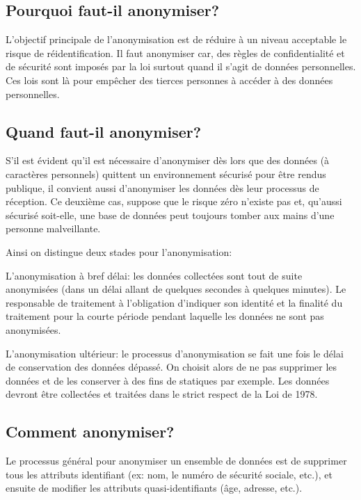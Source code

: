 \subsection{Pourquoi faut-il anonymiser?} 

L’objectif principale de l’anonymisation est de réduire à un niveau acceptable le risque de réidentification. Il faut anonymiser car, des règles de confidentialité et de sécurité sont imposés par la loi surtout quand il s’agit de données personnelles. Ces lois sont là pour empêcher des tierces personnes à accéder à des données personnelles. 


\subsection{Quand faut-il anonymiser?} 

S’il est évident qu’il est nécessaire d’anonymiser dès lors que des données (à caractères personnels) quittent un environnement sécurisé pour être rendus publique, il convient aussi d’anonymiser les données dès leur processus de réception. Ce deuxième cas, suppose que le risque zéro n’existe pas et, qu’aussi sécurisé soit-elle, une base de données peut toujours tomber aux mains d’une personne malveillante. 

Ainsi on distingue deux stades pour l’anonymisation: 

L’anonymisation à bref délai: les données collectées sont tout de suite anonymisées (dans un délai allant de quelques secondes à quelques minutes). Le responsable de traitement à l’obligation d’indiquer son identité et la finalité du traitement pour la courte période pendant laquelle les données ne sont pas anonymisées.  

L’anonymisation ultérieur: le processus d’anonymisation se fait une fois le délai de conservation des données dépassé. On choisit alors de ne pas supprimer les données et de les conserver à des fins de statiques par exemple. Les données devront être collectées et traitées dans le strict respect de la Loi de 1978.

\subsection{Comment anonymiser?} 

Le processus général pour anonymiser un ensemble de données est de supprimer tous les attributs identifiant (ex: nom, le numéro de sécurité sociale, etc.), et ensuite de modifier les attributs quasi-identifiants (âge, adresse, etc.).  

